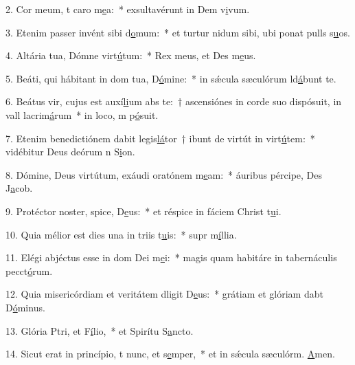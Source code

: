 2. Cor meum, t caro m\uline{e}a:~* exsultavérunt in Dem v\uline{i}vum.\par 
3. Etenim passer invént sibi d\uline{o}mum:~* et turtur nidum sibi, ubi ponat pulls s\uline{u}os.\par 
4. Altária tua, Dómne virt\uline{ú}tum:~* Rex meus, et Des m\uline{e}us.\par 
5. Beáti, qui hábitant in dom tua, D\uline{ó}mine:~* in sǽcula sæculórum ld\uline{á}bunt te.\par 
6. Beátus vir, cujus est auxí\uline{li}um abs te:~† ascensiónes in corde suo dispósuit, in vall lacrim\uline{á}rum~* in loco, m p\uline{ó}suit.\par 
7. Etenim benedictiónem dabit legis\uline{lá}tor~† ibunt de virtút in virt\uline{ú}tem:~* vidébitur Deus deórum n S\uline{i}on.\par 
8. Dómine, Deus virtútum, exáudi oratónem m\uline{e}am:~* áuribus pércipe, Des J\uline{a}cob.\par 
9. Protéctor noster, spice, D\uline{e}us:~* et réspice in fáciem Christ t\uline{u}i.\par 
10. Quia mélior est dies una in triis t\uline{u}is:~* supr m\uline{í}llia.\par 
11. Elégi abjéctus esse in dom Dei m\uline{e}i:~* magis quam habitáre in tabernáculis pecct\uline{ó}rum.\par 
12. Quia misericórdiam et veritátem dligit D\uline{e}us:~* grátiam et glóriam dabt D\uline{ó}minus.\par 
13. Glória Ptri, et F\uline{í}lio,~* et Spirítu S\uline{a}ncto.\par 
14. Sicut erat in princípio, t nunc, et s\uline{e}mper,~* et in sǽcula sæculórm. \uline{A}men.\par 
